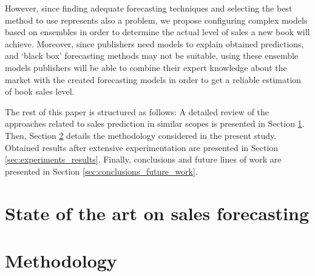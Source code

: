 \documentclass[a4paper,10pt,onecolumn,preprint,3p]{elsarticle}
\begin{document}
However, since finding adequate forecasting techniques and selecting the best method 
to use represents also a problem, we propose configuring complex models based on
ensembles \cite{Qiu2014} in order to determine the actual 
level of sales a new book will achieve.
Moreover, since publishers need models to explain obtained predictions, and 
`black box' forecasting methods may not be suitable, using these ensemble 
models publishers will be able to combine their expert knowledge about the 
market with the created forecasting models in order to get a reliable estimation 
of book sales level.


The rest of this paper is structured as follows: 
A detailed review of the approaches related to sales prediction in similar scopes is presented in Section \ref{sec:soa}.
Then, Section \ref{sec:methodology} details the methodology considered in the present study. 
Obtained results after extensive experimentation are presented in Section \ref{sec:experiments_results}.
Finally, conclusions and future lines of work are presented in Section \ref{sec:conclusions_future_work}.


\section{State of the art on sales forecasting} 
\label{sec:soa}


\section{Methodology}
\label{sec:methodology}
\end{document}
